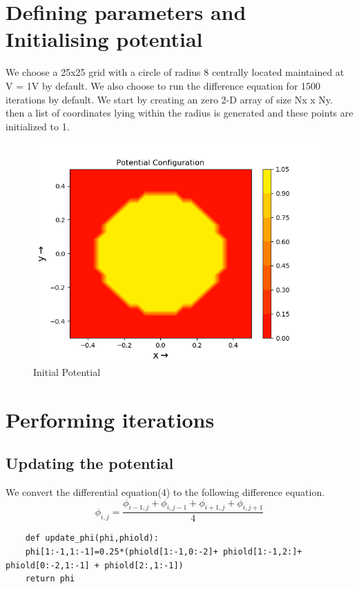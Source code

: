 \documentclass[11pt, a4paper]{article}
\begin{document}
\section{Defining parameters and Initialising potential}
We choose a 25x25 grid with a circle of radius 8 centrally located maintained at V = 1V by default. We also choose to run the difference equation for 1500 iterations by default.
We start by creating an zero 2-D array of size Nx x Ny. then a list of coordinates
lying within the radius is generated and these points are initialized to 1.
   \begin{figure}[!tbh]
   	\centering
   	\includegraphics[scale=0.5]{fig0.png}  %
   	\caption{Initial Potential}
   	\label{fig:sample}
   \end{figure} 
\section{Performing iterations}
	\subsection{Updating the potential}
	We convert the differential equation(4) to the following difference equation.
	\begin{equation}
	\phi_{i, j} = \frac{\phi_{i-1, j} + \phi_{i, j-1} + \phi_{i+1, j} + \phi_{i, j+1}}{4}
	\end{equation}
	\begin{verbatim}
	def update_phi(phi,phiold):
    phi[1:-1,1:-1]=0.25*(phiold[1:-1,0:-2]+ phiold[1:-1,2:]+ phiold[0:-2,1:-1] + phiold[2:,1:-1])
    return phi
	\end{verbatim}
\end{document}
